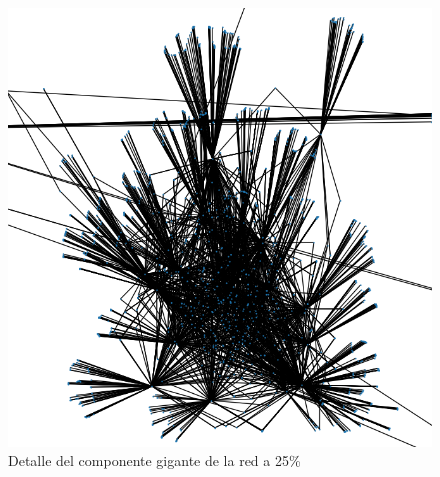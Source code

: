 \documentclass[12pt]{extreport}
\begin{document}
    \begin{figure}
        \centering
        \includegraphics[width=\textwidth]{net25-detail.png}
        \caption{Detalle del componente gigante de la red a 25\%}
        \label{fig:net25detail}
    \end{figure}
\end{document}
